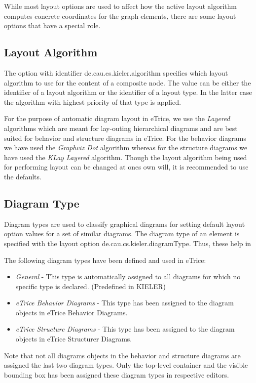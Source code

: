 While most layout options are used to affect how the active layout algorithm computes concrete coordinates for the graph elements, there are some layout options that have a special role.

\subsection{Layout Algorithm}

The option with identifier de.cau.cs.kieler.algorithm specifies which layout algorithm to use for the content of a composite node. The value can be either the identifier of a layout algorithm or the identifier of a layout type. In the latter case the algorithm with highest priority of that type is applied.

For the purpose of automatic diagram layout in eTrice, we use the \textit{Layered} algorithms which are meant for lay-outing hierarchical diagrams and are best suited for behavior and structure diagrams in eTrice. For the behavior diagrams we have used the \textit{Graphviz Dot} algorithm whereas for the structure diagrams we have used the \textit{KLay Layered} algorithm. Though the layout algorithm being used for performing layout can be changed at ones own will, it is recommended to use the defaults.  

\subsection{Diagram Type}

Diagram types are used to classify graphical diagrams for setting default layout option values for a set of similar diagrams. The diagram type of an element is specified with the layout option de.cau.cs.kieler.diagramType. Thus, these help in 

The following diagram types have been defined and used in eTrice:
\begin{itemize}
\item \textit{General} - This type is automatically assigned to all diagrams for which no specific type is declared. (Predefined in KIELER)
\item \textit{eTrice Behavior Diagrams} - This type has been assigned to the diagram objects in eTrice Behavior Diagrams. 
\item \textit{eTrice Structure Diagrams} - This type has been assigned to the diagram objects in eTrice Structurer Diagrams.
\end{itemize}
Note that not all diagrams objects in the behavior and structure diagrams are assigned the last two diagram types. Only the top-level container and the visible bounding box has been assigned these diagram types in respective editors.

